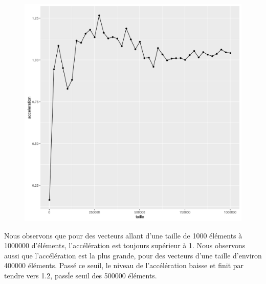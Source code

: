 \documentclass[a4paper,11pt]{scrartcl}
\begin{document}
\begin{figure}[H] \center
   \includegraphics[scale=0.5] {graphes/global_temps_machine_accel15.png}
\end{figure}

Nous observons que pour des vecteurs allant d'une taille de 1000 \'el\'ements \`a 1000000 d'\'el\'ements, l'acc\'el\'eration est toujours sup\'erieur \`a 1. Nous observons aussi que l'acc\'el\'eration est la plus grande, pour des vecteurs d'une taille d'environ 400000 \'el\'ements. Pass\'e ce seuil, le niveau de l'acc\'el\'eration baisse et finit par tendre vers 1.2, pass\' le seuil des 500000 \'el\'ements.   
\end{document}
